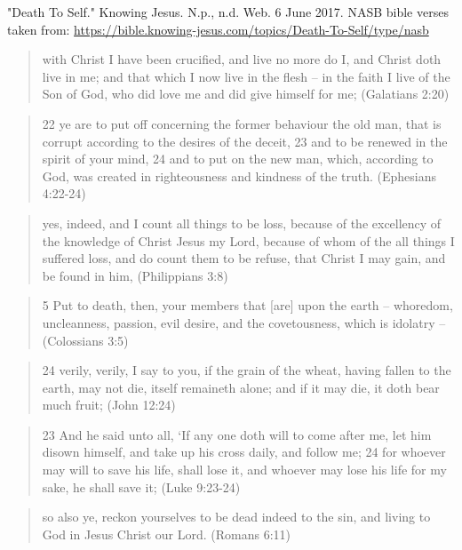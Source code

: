 \documentclass[11pt]{article}
\begin{document}
\begin{thebibliography}{37}
"Death To Self." Knowing Jesus. N.p., n.d. Web. 6 June 2017.
NASB bible verses taken from: \url{https://bible.knowing-jesus.com/topics/Death-To-Self/type/nasb}
\begin{quote}
with Christ I have been crucified, and live no more do I, and Christ doth live in me; and that which I now live in the flesh -- in the faith I live of the Son of God, who did love me and did give himself for me;
(Galatians 2:20)
\end{quote}
\begin{quote}
22 ye are to put off concerning the former behaviour the old man, that is corrupt according to the desires of the deceit,
23 and to be renewed in the spirit of your mind,
24 and to put on the new man, which, according to God, was created in righteousness and kindness of the truth.
(Ephesians 4:22-24)
\end{quote}
\begin{quote}
yes, indeed, and I count all things to be loss, because of the excellency of the knowledge of Christ Jesus my Lord, because of whom of the all things I suffered loss, and do count them to be refuse, that Christ I may gain, and be found in him,
(Philippians 3:8)
\end{quote}
\begin{quote}
5 Put to death, then, your members that [are] upon the earth -- whoredom, uncleanness, passion, evil desire, and the covetousness, which is idolatry --
(Colossians 3:5)
\end{quote}
\begin{quote}
24 verily, verily, I say to you, if the grain of the wheat, having fallen to the earth, may not die, itself remaineth alone; and if it may die, it doth bear much fruit; (John 12:24)
\end{quote}
\begin{quote}
23 And he said unto all, `If any one doth will to come after me, let him disown himself, and take up his cross daily, and follow me;
24 for whoever may will to save his life, shall lose it, and whoever may lose his life for my sake, he shall save it;
(Luke 9:23-24)
\end{quote}
\begin{quote}
so also ye, reckon yourselves to be dead indeed to the sin, and living to God in Jesus Christ our Lord.
(Romans 6:11)
\end{quote}
\begin{quote}

\end{quote}
\end{thebibliography}
\end{document}
